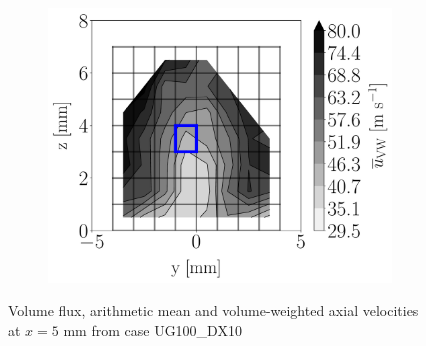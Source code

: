 \begin{figure}[h!]
\begin{subfigure}[b]{0.3\textwidth}
\end{subfigure}
   \hspace{0.17in}
\begin{subfigure}[b]{0.3\textwidth}
	\centering
   \includegraphics[scale=0.225]{./part2_developments/figures_ch5_resolved_JICF/injectors_SLI_extra/uG100_dx10_x05_ux_mean_VW_map}
\end{subfigure}

\caption{Volume flux, arithmetic mean and volume-weighted axial velocities at $x = 5$ mm from case UG100\_DX10}
\label{fig:injectors_SLI_extra_UG100_DX10_x05}
\end{figure}

\clearpage


